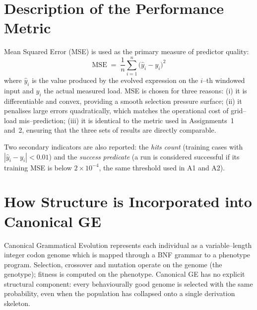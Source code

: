 \documentclass[12pt,a4paper]{article}
\begin{document}
\section{Description of the Performance Metric}

Mean Squared Error (MSE) is used as the primary measure of predictor
quality:
\begin{equation}
\mathrm{MSE} \;=\; \frac{1}{n}\sum_{i=1}^{n}\bigl(\hat{y}_i - y_i\bigr)^{2}
\end{equation}
where $\hat{y}_i$ is the value produced by the evolved expression on the
$i$--th windowed input and $y_i$ the actual measured load. MSE is chosen
for three reasons: (i) it is differentiable and convex, providing a smooth
selection pressure surface; (ii) it penalises large errors quadratically,
which matches the operational cost of grid--load mis--prediction;
(iii) it is identical to the metric used in Assignments~1 and~2, ensuring
that the three sets of results are directly comparable.

Two secondary indicators are also reported: the \emph{hits count}
(training cases with $|\hat{y}_i-y_i| < 0.01$) and the \emph{success
predicate} (a run is considered successful if its training MSE is below
$2 \times 10^{-4}$, the same threshold used in A1 and A2).

\section{How Structure is Incorporated into Canonical GE}

Canonical Grammatical Evolution \cite{ONeillRyan2001} represents each
individual as a variable--length integer codon genome which is mapped
through a BNF grammar to a phenotype program. Selection, crossover and
mutation operate on the genome (the genotype); fitness is computed on
the phenotype. Canonical GE has no explicit structural component: every
behaviourally good genome is selected with the same probability, even
when the population has collapsed onto a single derivation skeleton.
\end{document}
